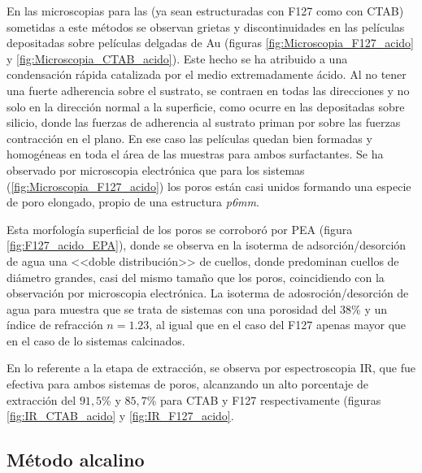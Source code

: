 		 En las microscopias para las \pdm (ya sean estructuradas con F127 como con CTAB) sometidas a este métodos se observan grietas y discontinuidades en las películas depositadas sobre películas delgadas de Au (figuras \ref{fig:Microscopia_F127_acido} y \ref{fig:Microscopia_CTAB_acido}). Este hecho se ha atribuido a una condensación rápida catalizada por el medio extremadamente ácido. Al no tener una fuerte adherencia sobre el sustrato, se contraen en todas las direcciones y no solo en la dirección normal a la superficie, como ocurre en las \pdm\space depositadas sobre silicio, donde las fuerzas de adherencia al sustrato priman por sobre las fuerzas contracción en el plano\cite{Sakatani2006,Boissiere2005,Guillemin2010}. En ese caso las películas quedan bien formadas y homogéneas en toda el área de las muestras para ambos surfactantes. Se ha observado por microscopia electrónica que para los sistemas \pdmF\space (\ref{fig:Microscopia_F127_acido}) los  poros están casi unidos formando una especie de poro elongado, propio de una estructura \textit{p6mm}\cite{GonzalezSolveyra2017}. 
	
		 Esta morfología superficial de los poros se corroboró por PEA (figura \ref{fig:F127_acido_EPA}), donde se observa en la isoterma de adsorción/desorción de agua una <<doble distribución>> de cuellos, donde predominan cuellos de diámetro grandes, casi del mismo tamaño que los poros, coincidiendo con la observación por microscopia electrónica.
		 La isoterma de adosroción/desorción de agua para \pdmC\space muestra que se trata de sistemas con una porosidad del 38\% y un índice de refracción $n=1.23$, al igual que en el caso del F127 apenas mayor que en el caso de lo sistemas calcinados.
		
		 En lo referente a la etapa de extracción, se observa por espectroscopia IR, que fue efectiva para ambos sistemas de poros, alcanzando un alto porcentaje de extracción del $91,5$\% y $85,7$\% para CTAB y F127 respectivamente (figuras \ref{fig:IR_CTAB_acido} y \ref{fig:IR_F127_acido}.  	
				
	 \subsection{Método alcalino}

